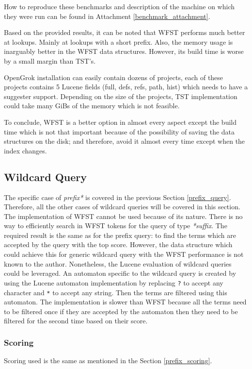 How to reproduce these benchmarks and description of the machine on which they were run can be found in Attachment \ref{benchmark_attachment}.

Based on the provided results, it can be noted that WFST performs much better at lookups. Mainly at lookups with a short prefix.
Also, the memory usage is inarguably better in the WFST data structures. However, its build time is worse by a small margin than TST's.

OpenGrok installation can easily contain dozens of projects, each of these projects contains 5 Lucene fields
(full, defs, refs, path, hist) which needs to have a suggester support. Depending on the size of the projects,
TST implementation could take many GiBs of the memory which is not feasible.

To conclude, WFST is a better option in almost every aspect except the build time which is not that important because of
the possibility of saving the data structures on the disk; and therefore, avoid it almost every time except when the index changes.

\subsection{Wildcard Query}
\label{wildcard_query}
The specific case of \textit{prefix*} is covered in the previous Section \ref{prefix_query}. Therefore,
all the other cases of wildcard queries will be covered in this section.
The implementation of WFST cannot be used because of its nature.
There is no way to efficiently search in WFST tokens for the query of type \textit{*suffix}. The required result is
the same as for the prefix query: to find the terms which are accepted by the query with the top score. However, the data
structure which could achieve this for generic wildcard query with the WFST performance is not known to the author.
Nonetheless, the Lucene evaluation of wildcard queries could be leveraged. An automaton specific to the wildcard query is
created by using the Lucene automaton implementation by replacing \texttt{?} to accept any character and \texttt{*} to accept
any string. Then the terms are filtered using this automaton. The implementation is slower than WFST because all the terms
need to be filtered once if they are accepted by the automaton then they need to be filtered for the second time based on
their score.

\subsubsection{Scoring}
Scoring used is the same as mentioned in the Section \ref{prefix_scoring}.

